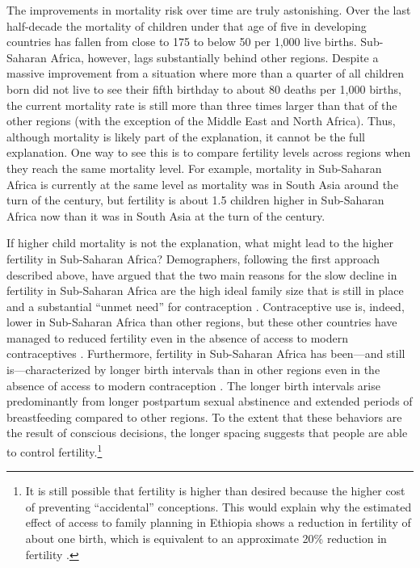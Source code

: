 The improvements in mortality risk over time are truly astonishing. Over the last half-decade the mortality of children under that age of five in developing countries has fallen from close to 175 to below 50 per 1,000 live births. Sub-Saharan Africa, however, lags substantially behind other regions. Despite a massive improvement from a situation where more than a quarter of all children born did not live to see their fifth birthday to about 80 deaths per 1,000 births, the current mortality rate is still more than three times larger than that of the other regions (with the exception of the Middle East and North Africa). Thus, although mortality is likely part of the explanation, it cannot be the full explanation. One way to see this is to compare fertility levels across regions when they reach the same mortality level. For example, mortality in Sub-Saharan Africa is currently at the same level as mortality was in South Asia around the turn of the century, but fertility is about 1.5 children higher in Sub-Saharan Africa now than it was in South Asia at the turn of the century.

If higher child mortality is not the explanation, what might lead to the higher fertility in Sub-Saharan Africa? Demographers, following the first approach described above, have argued that the two main reasons for the slow decline in fertility in Sub-Saharan Africa are the high ideal family size that is still in place and a substantial ``unmet need'' for contraception \citep{Bongaarts2013a,Casterline2017,Singh2017}. Contraceptive use is, indeed, lower in Sub-Saharan Africa than other regions, but these other countries have managed to reduced fertility even in the absence of access to modern contraceptives \citet{Schultz1985,Galloway1987,Bailey1998,bengtsson06}. Furthermore, fertility in Sub-Saharan Africa has been---and still is---characterized by longer birth intervals than in other regions even in the absence of access to modern contraception \citep{Caldwell1992,Moultrie2012,Casterline2016}. The longer birth intervals arise predominantly from longer postpartum sexual abstinence and extended periods of breastfeeding compared to other regions. To the extent that these behaviors are the result of conscious decisions, the longer spacing suggests that people are able to control fertility.\footnote{It is still possible that fertility is higher than desired because the higher cost of preventing ``accidental'' conceptions. This would explain why the estimated effect of access to family planning in Ethiopia shows a reduction in fertility of about one birth, which is equivalent to an approximate 20\% reduction in fertility \citep{Portner2014a}.}

